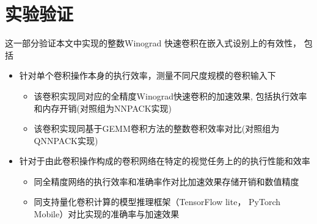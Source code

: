 \section{实验验证}

这一部分验证本文中实现的整数Winograd 快速卷积在嵌入式设别上的有效性，
包括
\begin{itemize}
  \item 针对单个卷积操作本身的执行效率，测量不同尺度规模的卷积输入下
    \begin{itemize}
        \item 该卷积实现同对应的全精度Winograd快速卷积的加速效果, 包括执行效率和内存开销(对照组为NNPACK实现)
        \item 该卷积实现同基于GEMM卷积方法的整数卷积效率对比(对照组为QNNPACK实现)
    \end{itemize}
  \item 针对于由此卷积操作构成的卷积网络在特定的视觉任务上的的执行性能和效率
    \begin{itemize}
        \item 同全精度网络的执行效率和准确率作对比加速效果存储开销和数值精度
        \item 同支持量化卷积计算的模型推理框架（TensorFlow lite， PyTorch Mobile）对比实现的准确率与加速效果
    \end{itemize}

\end{itemize}
